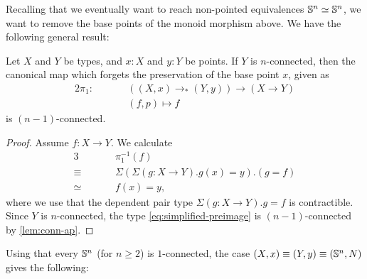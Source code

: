 \documentclass[english,a4]{article}
\newcommand{\ptdto}{\to_\ast}%
\newcommand{\setTrunc}[1]{\Trunc{#1}_0}
\begin{document}
Recalling that we eventually want to reach non-pointed equivalences ${\mathbb S^{n}} \simeq {\mathbb S^{n}}$, 
we want to remove the base points of the monoid morphism above. 
We have the following general result:


\begin{lemma} \label{lem:forget-points-conn}
    Let $X$ and $Y$ be types, and $x : X$ and $y : Y$ be points. If $Y$ is $n$-connected, then the canonical map which forgets the preservation of the base point $x$, given as
    \begin{alignat}{2}
    \pi_1: && \quad & ((X,x) \ptdto (Y,y)) \to (X \to Y) \\
    &&& (f,p) \mapsto f
    \end{alignat}
    is $(n-1)$-connected. 
\end{lemma}
\begin{proof}
    Assume $f : X \to Y$.
    We calculate
    \begin{alignat}{3}
    &\quad && \pi_1^{-1}(f) \\
    \equiv &&&  \Sigma\left(\Sigma(g : X \to Y).g(x) = y\right). (g = f) \\
    \simeq &&&  f(x) = y, \label{eq:simplified-preimage}
    \end{alignat}
    where we use that the dependent pair type $\Sigma(g : X \to Y). g = f$ is contractible.
    Since $Y$ is $n$-connected, the type \eqref{eq:simplified-preimage} is $(n-1)$-connected by \cref{lem:conn-ap}.
%    
\end{proof}

Using that every ${\mathbb S^{n}}$ (for $n \geq 2$) is $1$-connected, the case $(X,x) \equiv (Y,y) \equiv ({\mathbb S^{n}}, N)$ gives the following:
%
\end{document}
